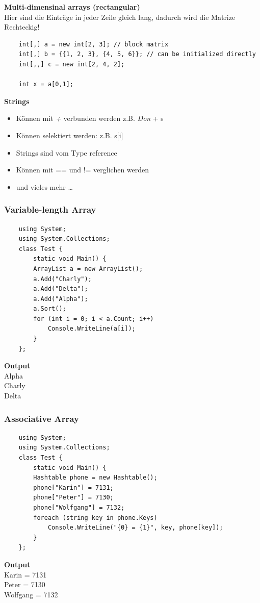 \textbf{Multi-dimensinal arrays (rectangular)}\\
Hier sind die Einträge in jeder Zeile gleich lang, dadurch wird die Matrize Rechteckig!
\begin{lstlisting}
	int[,] a = new int[2, 3]; // block matrix 
	int[,] b = {{1, 2, 3}, {4, 5, 6}}; // can be initialized directly 
	int[,,] c = new int[2, 4, 2];
	
	int x = a[0,1];
\end{lstlisting}

\textbf{Strings}
\begin{itemize}
	\item Können mit \textit{+} verbunden werden z.B. \textit{Don} + s
	\item Können selektiert werden: z.B. s[i]
	\item Strings sind vom Type reference
	\item Können mit == und != verglichen werden
	\item und vieles mehr \ldots
\end{itemize}

\subsubsection{Variable-length Array}
\begin{multicols}{2}

	\begin{lstlisting}
	using System;
	using System.Collections;
	class Test {
		static void Main() {
		ArrayList a = new ArrayList();
		a.Add("Charly");
		a.Add("Delta");
		a.Add("Alpha");
		a.Sort();
		for (int i = 0; i < a.Count; i++)
			Console.WriteLine(a[i]);
		}
	};
	\end{lstlisting}
	\columnbreak
	
	\textbf{Output}\\
		Alpha\\
		Charly\\
		Delta\\
\end{multicols}


\subsubsection{Associative Array}
\begin{multicols}{2}

	\begin{lstlisting}
	using System;
	using System.Collections;
	class Test {
		static void Main() {
		Hashtable phone = new Hashtable();
		phone["Karin"] = 7131;
		phone["Peter"] = 7130;
		phone["Wolfgang"] = 7132;
		foreach (string key in phone.Keys)
			Console.WriteLine("{0} = {1}", key, phone[key]);
		}
	};
	\end{lstlisting}
	\columnbreak
	
	\textbf{Output}\\
		Karin = 7131\\
		Peter = 7130\\
		Wolfgang = 7132\\
\end{multicols}


